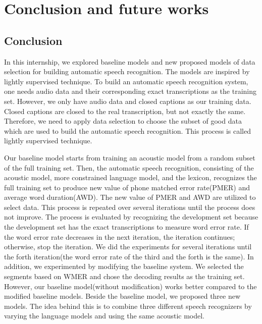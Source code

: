 \chapter{Conclusion and future works}

\section{Conclusion}
In this internship, we explored baseline models and new proposed models of data selection for building automatic speech recognition. The models are inspired by lightly supervised technique. To build an automatic speech recognition system, one needs audio data and their corresponding exact transcriptions as the training set. However, we only have audio data and closed captions as our training data. Closed captions are closed to the real transcription, but not exactly the same. Therefore, we need to apply data selection to choose the subset of good data which are used to build the automatic speech recognition. This process is called  lightly supervised technique.

Our baseline model starts from training an acoustic model from a random subset of the full training set. Then, the automatic speech recognition, consisting of the acoustic model, more constrained language model, and the lexicon, recognizes the full training set to produce new value of phone matched error rate(PMER) and average word duration(AWD). The new value of PMER and AWD are utilized to select data. This process is repeated over several iterations until the process does not improve. The process is evaluated by recognizing the development set because the development set has the exact transcriptions to measure word error rate. If the word error rate decreases in the next iteration, the iteration continues; otherwise, stop the iteration. We did the experiments for several iterations until the forth iteration(the word error rate of the third and the forth is the same). In addition, we experimented by modifying the baseline system. We selected the segments based on WMER and chose the decoding results as the training set. However, our baseline model(without modification) works better compared to the modified baseline models. Beside the baseline model, we proposed three new models. The idea behind this is to combine three different speech recognizers by varying the language models and using the same acoustic model. 

